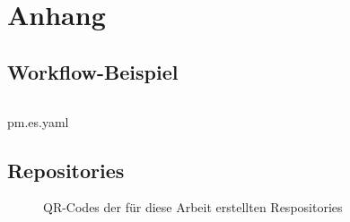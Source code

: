 \chapter*{Anhang}

\section{Workflow-Beispiel}\label{sec:workflow-beispiel}
\begin{listing}[!ht]
    \inputminted{yaml}{listings/appendix/pm.es.yaml}
    \caption{pm.es.yaml}
    \label{listing:pm-yaml}
\end{listing}

\newpage

\section{Repositories}\label{sec:repositories}

\begin{figure}[h]%
    \centering
    \qquad
    \caption{QR-Codes der für diese Arbeit erstellten Respositories}%
    \label{fig:repos}%
\end{figure}

